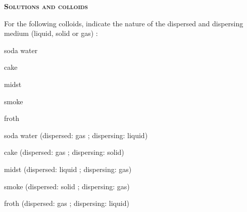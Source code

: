 \documentclass[main.tex]{subfiles}
\begin{document}
\newpage
\fancyhfoffset[E,O]{0pt}
\setlength{\columnsep}{30pt}
\begin{conclusion}
\end{conclusion}
\begin{multicols*}{2}\setcounter{numA}{1}



{\raggedright\textsc{\textbf{Solutions and colloids }}\par}
\begin{question}[ID=\the\value{numA}]
For the following colloids, indicate the nature of the dispersed and dispersing medium (liquid, solid or gas) : 
\begin{inparaenum}[(a)]	
\item  soda water %
\item  cake %
\item  midst %
\item  smoke %
\item  froth %
 \end{inparaenum}
\end{question}
\begin{solution}
\begin{inparaenum}[(a)]
\item  soda water   (dispersed: gas ; dispersing: liquid)
\item  cake   (dispersed: gas ; dispersing: solid)
\item  midst   (dispersed: liquid ; dispersing: gas)
\item  smoke   (dispersed: solid ; dispersing: gas)
\item  froth   (dispersed: gas ; dispersing: liquid)
 \end{inparaenum}
\hspace{0.1cm}\end{solution}%






\end{multicols*}
\end{document}
